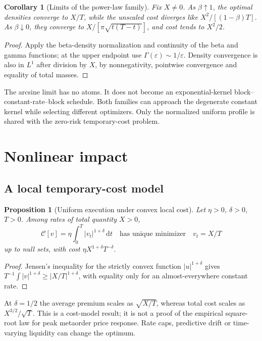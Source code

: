 \documentclass[11pt]{article}
\numberwithin{equation}{section}
\newtheorem{proposition}[theorem]{Proposition}
\newtheorem{corollary}[theorem]{Corollary}
\theoremstyle{definition}
\theoremstyle{remark}
\theoremstyle{definition}
\newcommand{\dd}{\,\mathrm d}
\begin{document}
\begin{corollary}[Limits of the power-law family]\label{cor:limits}
Fix $X\ne0$. As $\beta\uparrow1$, the optimal densities converge to $X/T$,
while the unscaled cost diverges like $X^2/[(1-\beta)T]$.
As $\beta\downarrow0$, they converge to
$X/[\pi\sqrt{t(T-t)}]$, and cost tends to $X^2/2$.
\end{corollary}
\begin{proof}
Apply the beta-density normalization and continuity of the beta and gamma
functions; at the upper endpoint use $\Gamma(\varepsilon)\sim1/\varepsilon$.
Density convergence is also in $L^1$ after division by $X$, by nonnegativity,
pointwise convergence and equality of total masses.
\end{proof}
The arcsine limit has no atoms. It does not become an exponential-kernel
block--constant-rate--block schedule. Both families can approach the degenerate
constant kernel while selecting different optimizers. Only the normalized
uniform profile is shared with the zero-risk temporary-cost problem.

\section{Nonlinear impact}\label{sec:nonlinear}
\subsection{A local temporary-cost model}
\begin{proposition}[Uniform execution under convex local cost]\label{prop:vwap}
Let $\eta>0$, $\delta>0$, $T>0$. Among rates of total quantity $X>0$,
\[
 \mathcal C[v]=\eta\int_0^T|v_t|^{1+\delta}\dd t
 \quad\text{has unique minimizer}\quad v_t=X/T
\]
up to null sets, with cost $\eta X^{1+\delta}T^{-\delta}$.
\end{proposition}
\begin{proof}
Jensen's inequality for the strictly convex function $|u|^{1+\delta}$ gives
$T^{-1}\int|v|^{1+\delta}\geq|X/T|^{1+\delta}$, with equality only for an
almost-everywhere constant rate.
\end{proof}
At $\delta=1/2$ the average premium scales as $\sqrt{X/T}$, whereas total
cost scales as $X^{3/2}/\sqrt T$. This is a cost-model result; it is not a
proof of the empirical square-root law for peak metaorder price response.
Rate caps, predictive drift or time-varying liquidity can change the optimum.
\end{document}

